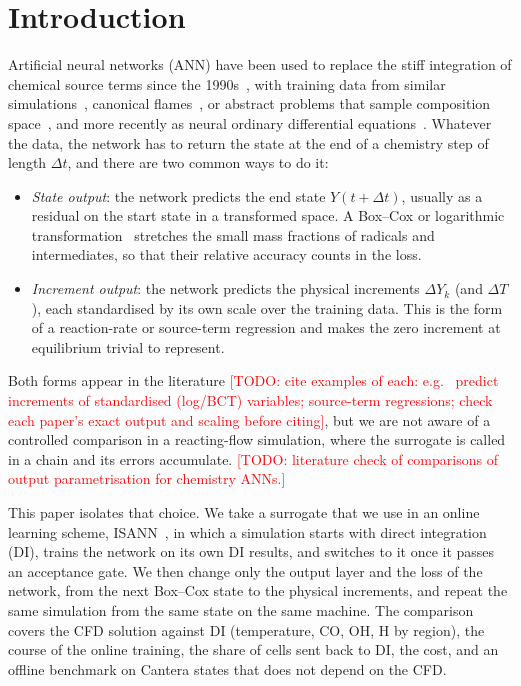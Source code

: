 \documentclass[preprint,review,12pt]{elsarticle}
\newcommand{\todo}[1]{\textcolor{red}{[TODO: #1]}}
\begin{document}
\section{Introduction}
\label{sec:intro}

Artificial neural networks (ANN) have been used to replace the stiff integration of chemical source
terms since the 1990s~\cite{christo1996ann,blasco1998ann}, with training data from similar
simulations~\cite{sen2010les}, canonical flames~\cite{ihme2009ann}, or abstract problems that sample
composition space~\cite{franke2017rcce,ding2021hybrid,readshaw2021hybrid}, and more recently as
neural ordinary differential equations~\cite{owoyele2022chemnode}. Whatever the data, the network has
to return the state at the end of a chemistry step of length $\Delta t$, and there are two common ways
to do it:
\begin{itemize}
\item \emph{State output}: the network predicts the end state $Y(t+\Delta t)$, usually as a residual
  on the start state in a transformed space. A Box--Cox or logarithmic transformation~\cite{boxcox1964}
  stretches the small mass fractions of radicals and intermediates, so that their relative accuracy
  counts in the loss.
\item \emph{Increment output}: the network predicts the physical increments $\Delta Y_k$ (and
  $\Delta T$), each standardised by its own scale over the training data. This is the form of a
  reaction-rate or source-term regression and makes the zero increment at equilibrium trivial to
  represent.
\end{itemize}
Both forms appear in the literature \todo{cite examples of each: e.g.\ \cite{franke2017rcce,ding2021hybrid}
predict increments of standardised (log/BCT) variables; source-term regressions; check each paper's
exact output and scaling before citing}, but we are not aware of a controlled comparison in a
reacting-flow simulation, where the surrogate is called in a chain and its errors accumulate.
\todo{literature check of comparisons of output parametrisation for chemistry ANNs.}

This paper isolates that choice. We take a surrogate that we use in an online learning scheme,
ISANN~\cite{isann2026}, in which a simulation starts with direct integration (DI), trains the network on
its own DI results, and switches to it once it passes an acceptance gate. We then change only the
output layer and the loss of the network, from the next Box--Cox state to the physical increments,
and repeat the same simulation from the same state on the same machine. The comparison covers the
CFD solution against DI (temperature, CO, OH, H by region), the course of the online training, the
share of cells sent back to DI, the cost, and an offline benchmark on Cantera states that does not
depend on the CFD.
\end{document}
